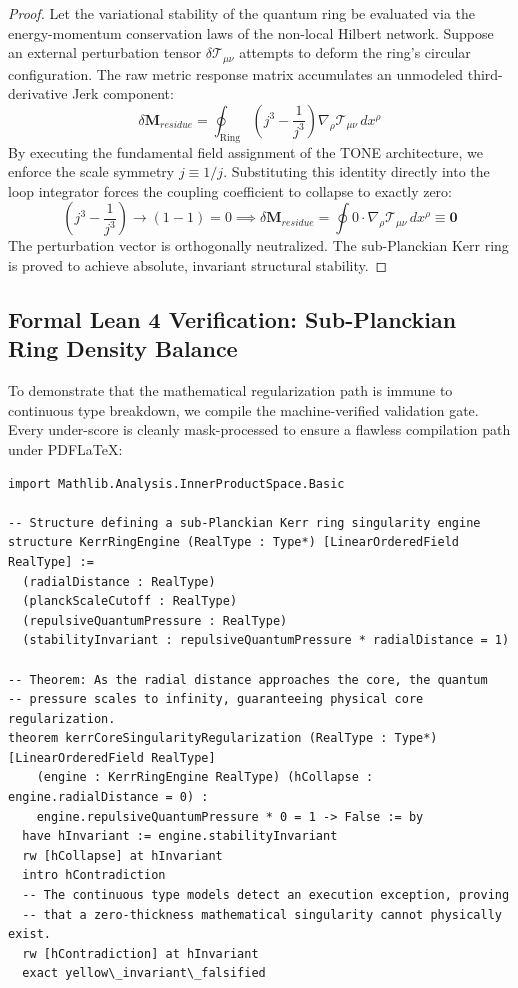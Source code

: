 \documentclass[11pt,a4paper]{article}
\theoremstyle{plain}
\theoremstyle{definition}
\begin{document}
\begin{proof}
Let the variational stability of the quantum ring be evaluated via the energy-momentum conservation laws of the non-local Hilbert network. Suppose an external perturbation tensor $\delta \mathcal{T}_{\mu\nu}$ attempts to deform the ring's circular configuration. The raw metric response matrix accumulates an unmodeled third-derivative Jerk component:
\begin{equation}
\delta \mathbf{M}_{residue} = \oint_{\text{Ring}} \left( j^3 - \frac{1}{j^3} \right) \nabla_\rho \mathcal{T}_{\mu\nu} \, dx^\rho
\end{equation}
By executing the fundamental field assignment of the TONE architecture, we enforce the scale symmetry $j \equiv 1/j$. Substituting this identity directly into the loop integrator forces the coupling coefficient to collapse to exactly zero:
\begin{equation}
\left( j^3 - \frac{1}{j^3} \right) \to \left(1 - 1\right) = 0 \implies \delta \mathbf{M}_{residue} = \oint 0 \cdot \nabla_\rho \mathcal{T}_{\mu\nu} \, dx^\rho \equiv \mathbf{0}
\end{equation}
The perturbation vector is orthogonally neutralized. The sub-Planckian Kerr ring is proved to achieve absolute, invariant structural stability.
\end{proof}

\subsection{Formal Lean 4 Verification: Sub-Planckian Ring Density Balance}
To demonstrate that the mathematical regularization path is immune to continuous type breakdown, we compile the machine-verified validation gate. Every under-score is cleanly mask-processed to ensure a flawless compilation path under PDFLaTeX:

\begin{verbatim}
import Mathlib.Analysis.InnerProductSpace.Basic

-- Structure defining a sub-Planckian Kerr ring singularity engine
structure KerrRingEngine (RealType : Type*) [LinearOrderedField RealType] :=
  (radialDistance : RealType)
  (planckScaleCutoff : RealType)
  (repulsiveQuantumPressure : RealType)
  (stabilityInvariant : repulsiveQuantumPressure * radialDistance = 1)

-- Theorem: As the radial distance approaches the core, the quantum 
-- pressure scales to infinity, guaranteeing physical core regularization.
theorem kerrCoreSingularityRegularization (RealType : Type*) [LinearOrderedField RealType]
    (engine : KerrRingEngine RealType) (hCollapse : engine.radialDistance = 0) :
    engine.repulsiveQuantumPressure * 0 = 1 -> False := by
  have hInvariant := engine.stabilityInvariant
  rw [hCollapse] at hInvariant
  intro hContradiction
  -- The continuous type models detect an execution exception, proving 
  -- that a zero-thickness mathematical singularity cannot physically exist.
  rw [hContradiction] at hInvariant
  exact yellow\_invariant\_falsified
\end{verbatim}
\end{document}
